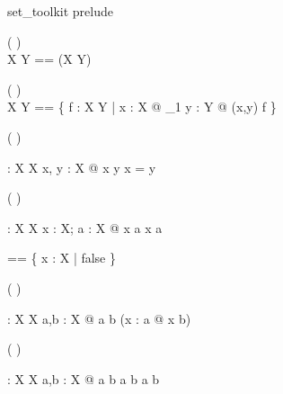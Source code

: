 \begin{zsection}
  \SECTION set\_toolkit \parents prelude
\end{zsection}

\begin{zed}
   \rightassoc ( \varg \rel \varg )\\
  X \rel Y == \power (X \cross Y)
\end{zed}

\begin{zed}
   \rightassoc ( \varg \fun \varg )\\
  X \fun Y == \{ f : X \rel Y | \forall x : X @ \exists_1 y : Y @
      (x,y) \in f \}
\end{zed}

\begin{zed}
  \relation ( \varg \neq \varg)
\end{zed}

\begin{gendef}[X]
  \varg \neq \varg : X \rel X
\where
  \forall x, y : X @ x \neq y \iff \lnot x = y
\end{gendef}

\begin{zed}
  \relation ( \varg \notin \varg )
\end{zed}

\begin{gendef}[X]
  \varg \notin \varg : X \rel \power X
\where
  \forall x : X; a : \power X @ x \notin a \iff \lnot x \in a
\end{gendef}

\begin{zed}
  \emptyset [X] == \{ x : X | false \}
\end{zed}

\begin{zed}
  \relation ( \varg \subseteq \varg )
\end{zed}

\begin{gendef}[X]
  \varg \subseteq \varg : \power X \rel \power X
\where
  \forall a,b : \power X @ a \subseteq b \iff (\forall x : a @ x \in b)
\end{gendef}

\begin{zed}
  \relation ( \varg \subset \varg )
\end{zed}

\begin{gendef}[X]
  \varg \subset \varg : \power X \rel \power X
\where
  \forall a,b : \power X @ a \subset b \iff a \subseteq b \land a \neq b
\end{gendef}

